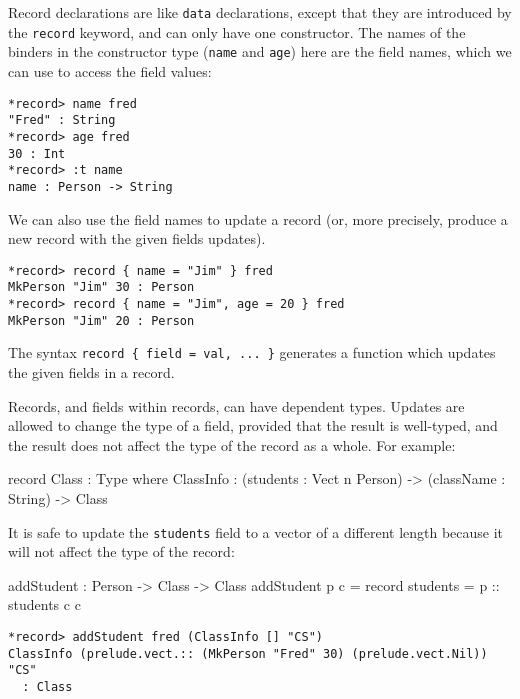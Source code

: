 \noindent
Record declarations are like \texttt{data} declarations, except that they are  introduced by the \texttt{record} keyword, and can only have one constructor.
The names of the binders in the constructor type (\texttt{name} and \texttt{age}) here are the field names, which we can use to access the field values:

\begin{lstlisting}[style=stdout]
*record> name fred
"Fred" : String
*record> age fred
30 : Int
*record> :t name
name : Person -> String
\end{lstlisting}

\noindent
We can also use the field names to update a record (or, more precisely, produce a new record with the given fields updates).

\begin{lstlisting}[style=stdout]
*record> record { name = "Jim" } fred
MkPerson "Jim" 30 : Person
*record> record { name = "Jim", age = 20 } fred
MkPerson "Jim" 20 : Person
\end{lstlisting}

\noindent
The syntax \texttt{record \{ field = val, ... \}} generates a function which updates the given fields in a record. 

Records, and fields within records, can have dependent types.
Updates are allowed to change the type of a field, provided that the result is well-typed, and the result does not affect the type of the record as a whole.
For example:

\begin{code}
record Class : Type where
    ClassInfo : (students : Vect n Person) ->
                (className : String) ->
                Class
\end{code}

\noindent
It is safe to update the \texttt{students} field to a vector of a different length because it will not affect the type of the record:

\begin{code}
addStudent : Person -> Class -> Class
addStudent p c = record { students = p :: students c } c
\end{code}

\begin{lstlisting}[style=stdout]
*record> addStudent fred (ClassInfo [] "CS")
ClassInfo (prelude.vect.:: (MkPerson "Fred" 30) (prelude.vect.Nil)) "CS" 
  : Class
\end{lstlisting}


